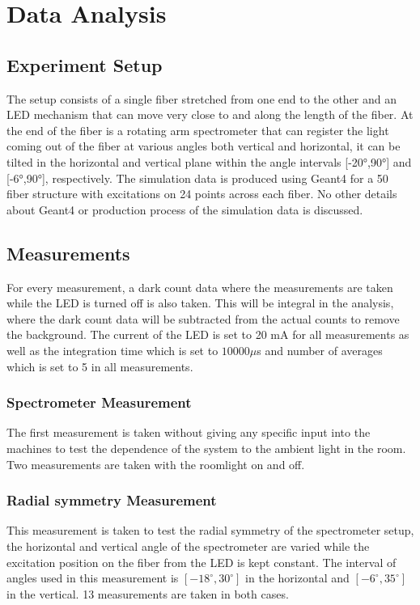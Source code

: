\chapter{Data Analysis}\label{chap:02}

\section{Experiment Setup}
The setup consists of a single fiber stretched from one end to the other and an LED mechanism that can move very close to and along the length of the fiber. At the end of the fiber is a rotating arm spectrometer that can register the light coming out of the fiber at various angles both vertical and horizontal, it can be tilted in the horizontal
and vertical plane within the angle intervals [-20°,90°] and [-6°,90°], respectively.
The simulation data is produced using Geant4 for a 50 fiber structure with excitations on 24 points across each fiber. No other details about Geant4 or production process of the simulation data is discussed.

\section{Measurements}
For every measurement, a dark count data where the measurements are taken while the LED is turned off is also taken. This will be integral in the analysis, where the dark count data will be subtracted from the actual counts to remove the background. The current of the LED is set to 20 mA for all measurements as well as the integration time which is set to $10000 \mu$s and number of averages which is set to 5 in all measurements.

\subsection{Spectrometer Measurement}
The first measurement is taken without giving any specific input into the machines to test the dependence of the system to the ambient light in the room. Two measurements are taken with the roomlight on and off.

\subsection{Radial symmetry Measurement}
This measurement is taken to test the radial symmetry of the spectrometer setup, the horizontal and vertical angle of the spectrometer are varied while the excitation position on the fiber from the LED is kept constant. The interval of angles used in this measurement is $\left[-18^{\circ}, 30^{\circ}\right]$ in the horizontal and $\left[-6^{\circ}, 35^{\circ}\right]$ in the vertical. 13 measurements are taken in both cases.


